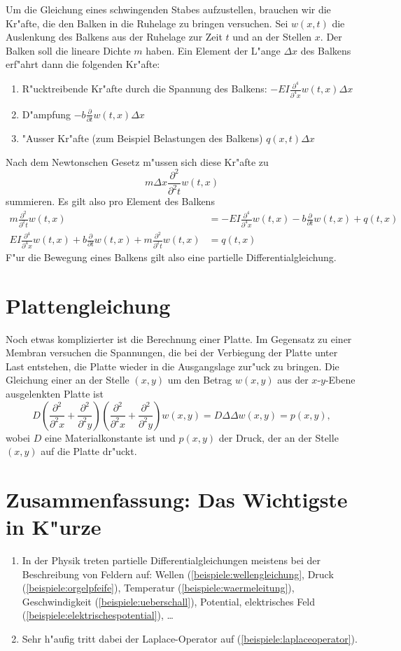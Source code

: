 Um die Gleichung eines schwingenden Stabes aufzustellen, brauchen wir
die Kr"afte, die den Balken in die Ruhelage zu bringen versuchen. Sei
$w(x,t)$ die Auslenkung des Balkens aus der Ruhelage zur Zeit $t$
und an der Stellen $x$. Der Balken soll die lineare Dichte $m$ haben.
Ein Element der L"ange $\Delta x$ des Balkens erf"ahrt dann die
folgenden Kr"afte:
\begin{enumerate}
\item R"ucktreibende Kr"afte durch die Spannung des Balkens: $-EI\frac{\partial^4}{\partial^4 x}w(t,x)\Delta x$
\item D"ampfung $-b\frac{\partial}{\partial t}w(t,x)\Delta x$
\item "Ausser Kr"afte (zum Beispiel Belastungen des Balkens) $q(x,t)\Delta x$
\end{enumerate}
Nach dem Newtonschen Gesetz m"ussen sich diese Kr"afte zu
\[
m\Delta x\frac{\partial^2}{\partial^2 t}w(t,x)
\]
summieren. Es gilt also pro Element des Balkens
\begin{align*}
m\frac{\partial^2}{\partial^2t}w(t,x)
&=-EI\frac{\partial^4}{\partial^4x}w(t,x)-b\frac{\partial}{\partial t}w(t,x)+q(t,x)
\\
EI\frac{\partial^4}{\partial^4x}w(t,x)
+b\frac{\partial}{\partial t}w(t,x)
+m\frac{\partial^2}{\partial^2t}w(t,x)
&=q(t,x)
\end{align*}
F"ur die Bewegung eines Balkens gilt also eine partielle Differentialgleichung.

\section{Plattengleichung\label{beispiele:plattengleichung}}
Noch etwas komplizierter ist die Berechnung einer Platte. Im Gegensatz
zu einer Membran versuchen die Spannungen, die bei der Verbiegung der
Platte unter Last entstehen, die Platte wieder in die Ausgangslage zur"uck
zu bringen. Die Gleichung einer an der Stelle $(x,y)$ um den Betrag
$w(x,y)$ aus der $x$-$y$-Ebene ausgelenkten Platte ist
\[
D\left(
\frac{\partial^2}{\partial^2 x}
+
\frac{\partial^2}{\partial^2 y}
\right)
\left(
\frac{\partial^2}{\partial^2 x}
+
\frac{\partial^2}{\partial^2 y}
\right)
w(x,y)
=D\Delta\Delta w(x,y)
=p(x,y),
\]
wobei $D$ eine Materialkonstante ist und $p(x,y)$ der Druck, der
an der Stelle $(x,y)$ auf die Platte dr"uckt.

\section{Zusammenfassung: Das Wichtigste in K"urze\label{beispiele:zusammenfassung}}
\begin{enumerate}
\item In der Physik treten partielle Differentialgleichungen meistens
bei der Beschreibung von Feldern auf: Wellen (\ref{beispiele:wellengleichung},
Druck (\ref{beispiele:orgelpfeife}),
Temperatur (\ref{beispiele:waermeleitung}),
Geschwindigkeit (\ref{beispiele:ueberschall}), Potential,
elektrisches Feld (\ref{beispiele:elektrischespotential}), \dots
\item Sehr h"aufig tritt dabei der Laplace-Operator auf (\ref{beispiele:laplaceoperator}).
\end{enumerate}

